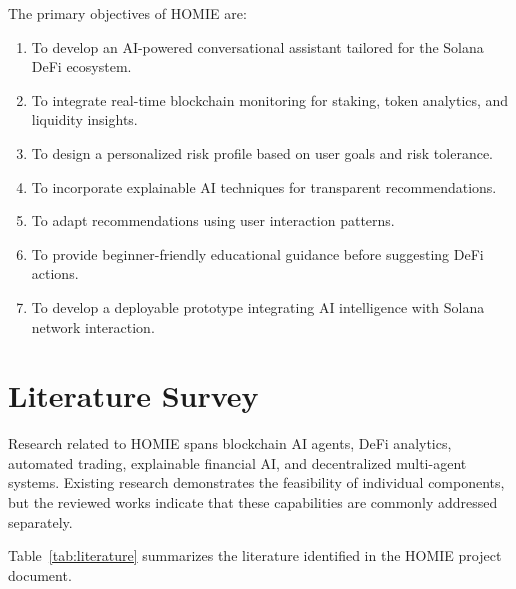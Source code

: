 \documentclass[conference]{IEEEtran}
\begin{document}
The primary objectives of HOMIE are:
\begin{enumerate}
    \item To develop an AI-powered conversational assistant tailored for the Solana DeFi ecosystem.
    \item To integrate real-time blockchain monitoring for staking, token analytics, and liquidity insights.
    \item To design a personalized risk profile based on user goals and risk tolerance.
    \item To incorporate explainable AI techniques for transparent recommendations.
    \item To adapt recommendations using user interaction patterns.
    \item To provide beginner-friendly educational guidance before suggesting DeFi actions.
    \item To develop a deployable prototype integrating AI intelligence with Solana network interaction.
\end{enumerate}

\section{Literature Survey}

Research related to HOMIE spans blockchain AI agents, DeFi analytics, automated trading, explainable financial AI, and decentralized multi-agent systems. Existing research demonstrates the feasibility of individual components, but the reviewed works indicate that these capabilities are commonly addressed separately.

Table~\ref{tab:literature} summarizes the literature identified in the HOMIE project document.
\end{document}
